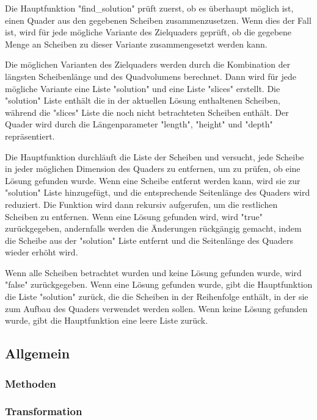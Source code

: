 \documentclass[a4paper,10pt,ngerman]{scrartcl}
\begin{document}
    Die Hauptfunktion "find\_solution" prüft zuerst, ob es überhaupt möglich ist, einen Quader aus den gegebenen Scheiben zusammenzusetzen.
    Wenn dies der Fall ist, wird für jede mögliche Variante des Zielquaders geprüft, ob die gegebene Menge an Scheiben zu dieser Variante zusammengesetzt werden kann.

    Die möglichen Varianten des Zielquaders werden durch die Kombination der längsten Scheibenlänge und des Quadvolumens berechnet.
    Dann wird für jede mögliche Variante eine Liste "solution" und eine Liste "slices" erstellt.
    Die "solution" Liste enthält die in der aktuellen Lösung enthaltenen Scheiben, während die "slices" Liste die noch nicht betrachteten Scheiben enthält.
    Der Quader wird durch die Längenparameter "length", "height" und "depth" repräsentiert.

    Die Hauptfunktion durchläuft die Liste der Scheiben und versucht, jede Scheibe in jeder möglichen Dimension des Quaders zu entfernen, um zu prüfen, ob eine Lösung gefunden wurde.
    Wenn eine Scheibe entfernt werden kann, wird sie zur "solution" Liste hinzugefügt, und die entsprechende Seitenlänge des Quaders wird reduziert.
    Die Funktion wird dann rekursiv aufgerufen, um die restlichen Scheiben zu entfernen.
    Wenn eine Lösung gefunden wird, wird "true" zurückgegeben, andernfalls werden die Änderungen rückgängig gemacht,
    indem die Scheibe aus der "solution" Liste entfernt und die Seitenlänge des Quaders wieder erhöht wird.

    Wenn alle Scheiben betrachtet wurden und keine Lösung gefunden wurde, wird "false" zurückgegeben.
    Wenn eine Lösung gefunden wurde, gibt die Hauptfunktion die Liste "solution" zurück, die die Scheiben in der Reihenfolge enthält, in der sie zum Aufbau des Quaders verwendet werden sollen.
    Wenn keine Lösung gefunden wurde, gibt die Hauptfunktion eine leere Liste zurück.

    \subsection{Allgemein}\label{subsec:allgemein2}

    \subsubsection{Methoden}\label{subsubsec:methoden}

    \subsubsection{Transformation}\label{subsubsec:transformation}
\end{document}
